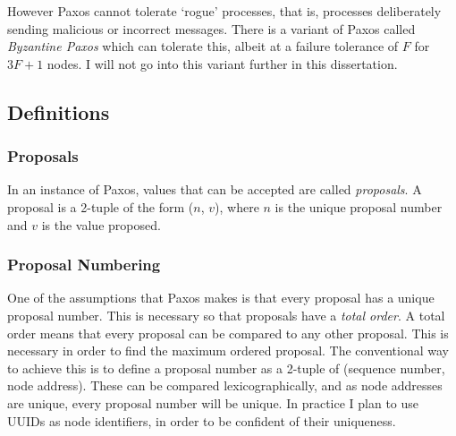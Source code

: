 \documentclass[12pt,twoside,notitlepage]{report}
\begin{document}
%

However Paxos cannot tolerate `rogue' processes, that is, processes deliberately sending
malicious or incorrect messages. There is a variant of Paxos called \emph{Byzantine Paxos} which
can tolerate this, albeit at a failure tolerance of $F$ for $3F + 1$ nodes. I will not go into
this variant further in this dissertation.

\subsection{Definitions}

\subsubsection*{Proposals}

In an instance of Paxos, values that can be accepted are called \emph{proposals}. A proposal is a
2-tuple of the form ($n$, $v$), where $n$ is the unique proposal number and $v$ is the value
proposed.

\subsubsection*{Proposal Numbering}

One of the assumptions that Paxos makes is that every proposal has a unique proposal number. This
is necessary so that proposals have a \emph{total order}. A total order means that every proposal
can be compared to any other proposal. This is necessary in order to
find the maximum ordered proposal. The conventional way to achieve this is to define a proposal
number as a 2-tuple of (sequence number, node address). These can be compared lexicographically,
and as node addresses are unique, every proposal number will be unique. In practice I plan to use
UUIDs as node identifiers, in order to be confident of their uniqueness.
\end{document}
